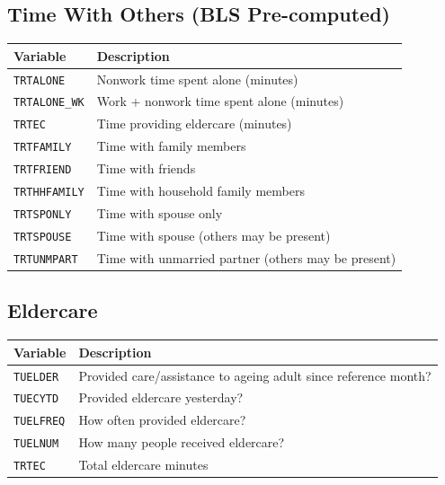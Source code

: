 \documentclass[11pt, a4paper]{article}
\begin{document}
\subsection{Time With Others (BLS Pre-computed)}
\begin{longtable}{L{3.8cm} L{12cm}}
\toprule \textbf{Variable} & \textbf{Description} \\ \midrule \endhead
\bottomrule \endfoot
\texttt{TRTALONE}      & Nonwork time spent alone (minutes) \\
 \texttt{TRTALONE\_WK}  & Work + nonwork time spent alone (minutes) \\
\texttt{TRTEC}         & Time providing eldercare (minutes) \\
 \texttt{TRTFAMILY}     & Time with family members \\
\texttt{TRTFRIEND}     & Time with friends \\
 \texttt{TRTHHFAMILY}   & Time with household family members \\
\texttt{TRTSPONLY}     & Time with spouse only \\
 \texttt{TRTSPOUSE}     & Time with spouse (others may be present) \\
\texttt{TRTUNMPART}    & Time with unmarried partner (others may be present) \\
\end{longtable}

\subsection{Eldercare}
\begin{longtable}{L{3.8cm} L{12cm}}
\toprule \textbf{Variable} & \textbf{Description} \\ \midrule \endhead
\bottomrule \endfoot
\texttt{TUELDER}  & Provided care/assistance to ageing adult since reference month? \\
 \texttt{TUECYTD}  & Provided eldercare yesterday? \\
\texttt{TUELFREQ} & How often provided eldercare? \\
 \texttt{TUELNUM}  & How many people received eldercare? \\
\texttt{TRTEC}    & Total eldercare minutes \\
\end{longtable}
\end{document}
